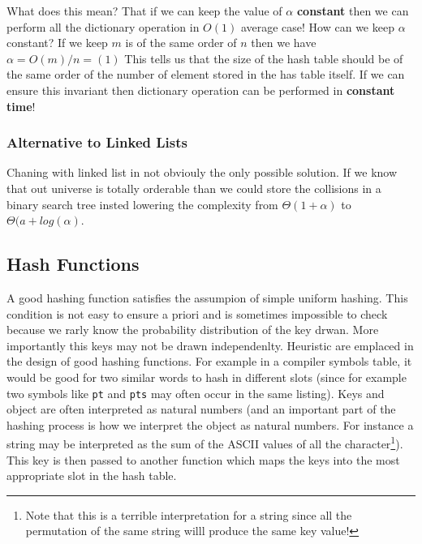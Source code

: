 What does this mean? That if we can keep  the value of $\alpha$ \textbf{constant} then we can perform all the dictionary operation in $O(1)$ average case! How can we keep $\alpha$ constant? If we keep $m$ is of the same order of $n$ then we have $\alpha = O(m)/n =(1)$ This tells us that the size of the hash table should be of the same order of the number of element stored in the has table itself. If we can ensure this invariant then dictionary operation can be performed in \textbf{constant time}!

\subsubsection{Alternative to Linked Lists}
Chaning with linked list in not obviouly the only possible solution. If we know that out universe is totally orderable than we could store the collisions in a binary search tree insted lowering the complexity from $\Theta(1+\alpha)$ to $\Theta(a+log(\alpha)$.


\subsection{Hash Functions}
A good hashing function satisfies the assumpion of simple uniform hashing. This condition is not easy to ensure a priori and is sometimes impossible to check because we rarly know the probability distribution of the key drwan. More importantly this keys may not be drawn independenlty. 
Heuristic are emplaced in the design of good hashing functions. For example in a compiler symbols table, it would be good for two similar words to hash in different slots (since for example two symbols like \texttt{pt} and \texttt{pts} may often occur in the same listing). 
Keys and object are often interpreted as natural numbers (and an important part of the hashing process is how we interpret the object as natural numbers. For instance a string may be interpreted as the sum of the ASCII values of all the character\footnote{Note that this is a terrible interpretation for a string since all the permutation of the same string willl produce the same key value!}). This key is then passed to another function which maps the keys into the most appropriate slot in the hash table. 


